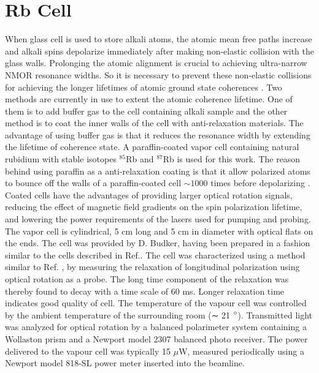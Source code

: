 \section{Rb Cell}
When glass cell is used to store alkali atoms, the atomic mean free paths increase and alkali spins depolarize immediately after making non-elastic collision with the glass walls. Prolonging the atomic alignment is crucial to achieving ultra-narrow NMOR resonance widths. So it is necessary to prevent these non-elastic collisions for achieving the longer lifetimes of atomic ground state coherences \cite{PhysRevA.72.023401,Balabas:10,doi:10.1063/1.3236649}. Two methods are currently in use to extent the atomic coherence lifetime. One of them is to add buffer gas to the cell containing alkali sample and the other method is to coat the inner walls of the cell with anti-relaxation materials. The advantage of using buffer gas is that it reduces the resonance width by extending the lifetime of coherence state. A paraffin-coated vapor cell containing  natural rubidium with stable isotopes $^{85}$Rb and $^{87}$Rb is used for this work. The reason behind using paraffin as a anti-relaxation coating is that it allow polarized atoms to bounce off the walls of a paraffin-coated cell $\sim 1000$ times before depolarizing \cite{PhysRev.147.41,PhysRevA.72.023401}. Coated cells have the advantages of providing larger optical rotation
signals, reducing the effect of magnetic field gradients on the spin polarization lifetime,
and lowering the power requirements of the lasers used for pumping and probing. The vapor cell is cylindrical, 5 cm long and 5 cm in diameter with optical
flats on the ends. The cell was provided by D. Budker, having been prepared in
a fashion similar to the cells described in Ref.\cite{PhysRevA.72.023401}. The cell was characterized
using a method similar to Ref. \cite{PhysRevA.72.023401}, by measuring the relaxation of longitudinal
polarization using optical rotation as a probe. The long time component of the relaxation was thereby found to decay with a time scale of 60 ms.  Longer relaxation time indicates good quality of cell. The temperature of the vapour cell was controlled by the ambient temperature of the surrounding room (∼ 21 $\degree$). Transmitted light was analyzed for optical rotation by a balanced polarimeter system containing a Wollaston prism and a Newport model 2307 balanced photo receiver. The power delivered to the vapour cell was typically 15 $\mu$W, measured periodically using a Newport model 818-SL power meter inserted into the
beamline. 
